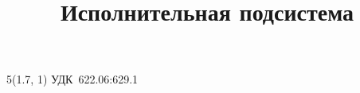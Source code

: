 

\title{Исполнительная подсистема}



	\begin{textblock}{5}(1.7, 1) %
		\footnotesize УДК~622.06:629.1
	\end{textblock}

	\maketitle

	

	\printbibliography


